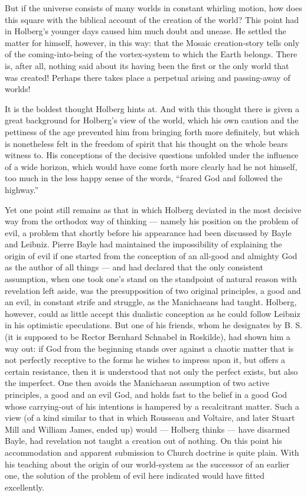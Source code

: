 \documentclass[12pt,a4paper]{book}
\newcommand{\opage}[1]{\marginnote{\footnotesize\textit{[#1]}}}
\begin{document}
But if the universe consists of many worlds in constant whirling motion, how does
this square with the biblical account of the creation of the world? This point had
in Holberg's younger days caused him much doubt and unease. He settled the matter
for himself, however, in this way: that the Mosaic creation-story tells only of
the coming-into-being of the vortex-system to which the Earth belongs. There is,
after all, nothing said about its having been the first or the only world that \opage{14}was
created! Perhaps there takes place a perpetual arising and passing-away of worlds!

It is the boldest thought Holberg hints at. And with this thought there is given a
great background for Holberg's view of the world, which his own caution and the
pettiness of the age prevented him from bringing forth more definitely, but which
is nonetheless felt in the freedom of spirit that his thought on the whole bears
witness to. His conceptions of the decisive questions unfolded under the influence
of a wide horizon, which would have come forth more clearly had he not himself,
too much in the less happy sense of the words, ``feared God and followed the
highway.''

Yet one point still remains as that in which Holberg deviated in the most decisive
way from the orthodox way of thinking --- namely his position on the problem of
evil, a problem that shortly before his appearance had been discussed by Bayle and
Leibniz. Pierre Bayle had maintained the impossibility of explaining the origin of
evil if one started from the conception of an all-good and almighty God as the
author of all things --- and had declared that the only consistent assumption,
when one took one's stand on the standpoint of natural reason with revelation left
aside, was the presupposition of two original principles, a good and an evil, in
constant strife and struggle, as the Manichaeans had taught. Holberg, however,
could as little accept this dualistic conception as he could follow Leibniz in his
optimistic speculations. But one of his friends, whom he designates by B. S. (it
is supposed to be Rector Bernhard Schnabel in Roskilde), had shown him a way out:
if God from the beginning stands over against a chaotic matter that is not
perfectly receptive to the forms he wishes to impress upon it, but offers a
certain resistance, then it is understood that not only the perfect exists, but
also the imperfect. One then avoids the Manichaean assumption of two active
principles, a good and an evil God, and holds fast to the belief in a good God
whose carrying-out of his intentions is hampered by a recalcitrant matter. Such a
view (of a kind similar to that in which Rousseau \opage{15}and Voltaire, and later Stuart
Mill and William James, ended up) would --- Holberg thinks --- have disarmed
Bayle, had revelation not taught a creation out of nothing. On this point his
accommodation and apparent submission to Church doctrine is quite plain. With his
teaching about the origin of our world-system as the successor of an earlier one,
the solution of the problem of evil here indicated would have fitted excellently.
\end{document}
